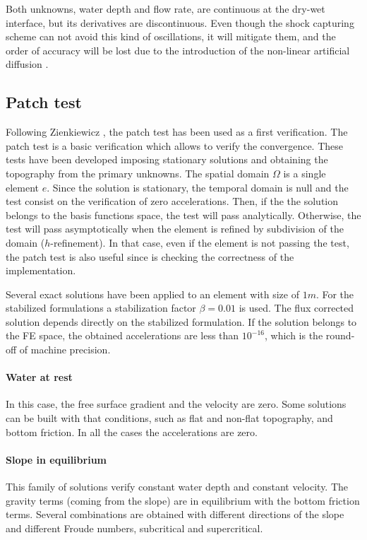 Both unknowns, water depth and flow rate, are continuous at the dry-wet interface, but its derivatives are discontinuous. Even though the shock capturing scheme can not avoid this kind of oscillations, it will mitigate them, and the order of accuracy will be lost due to the introduction of the non-linear artificial diffusion \cite{badia2014}.






\subsection{Patch test}


Following Zienkiewicz \cite{zien1}, the patch test has been used as a first verification. The patch test is a basic verification which allows to verify the convergence. These tests have been developed imposing stationary solutions and obtaining the topography from the primary unknowns. The spatial domain $\Omega$ is a single element $e$.
Since the solution is stationary, the temporal domain is null and the test consist on the verification of zero accelerations.
Then, if the the solution belongs to the basis functions space, the test will pass analytically.
Otherwise, the test will pass asymptotically when the element is refined by subdivision of the domain ($h$-refinement). In that case, even if the element is not passing the test, the patch test is also useful since is checking the correctness of the implementation.

Several exact solutions have been applied to an element with size of $1m$. For the stabilized formulations a stabilization factor $\beta=0.01$ is used. The flux corrected solution depends directly on the stabilized formulation. If the solution belongs to the FE space, the obtained accelerations are less than $10^{-16}$, which is the round-off of machine precision.

\paragraph{Water at rest}
In this case, the free surface gradient and the velocity are zero. Some solutions can be built with that conditions, such as flat and non-flat topography, and bottom friction. In all the cases the accelerations are zero.

\paragraph{Slope in equilibrium}
This family of solutions verify constant water depth and constant velocity. The gravity terms (coming from the slope) are in equilibrium with the bottom friction terms. Several combinations are obtained with different directions of the slope and different Froude numbers, subcritical and supercritical.

